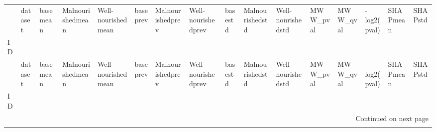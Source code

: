 \begin{longtable}{llllllllllllllll}
\toprule
{} &   dataset &                basemean &        Malnourishedmean &      Well-nourishedmean &            baseprev &    Malnourishedprev &  Well-nourishedprev &                 basestd &         Malnourishedstd &       Well-nourishedstd &                MWW\_pval &                MWW\_qval &            -log2(pval) &                SHAPmean &                 SHAPstd \\
ID                                                 &           &                         &                         &                         &                     &                     &                     &                         &                         &                         &                         &                         &                        &                         &                         \\
\midrule
\endfirsthead

\toprule
{} &   dataset &                basemean &        Malnourishedmean &      Well-nourishedmean &            baseprev &    Malnourishedprev &  Well-nourishedprev &                 basestd &         Malnourishedstd &       Well-nourishedstd &                MWW\_pval &                MWW\_qval &            -log2(pval) &                SHAPmean &                 SHAPstd \\
ID                                                 &           &                         &                         &                         &                     &                     &                     &                         &                         &                         &                         &                         &                        &                         &                         \\
\midrule
\endhead
\midrule
\multicolumn{16}{r}{{Continued on next page}} \\
\midrule
\endfoot


\end{longtable}
